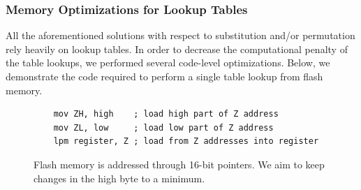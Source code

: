 \documentclass[11pt]{llncs2e} %
\begin{document}

 

\subsubsection{Memory Optimizations for Lookup Tables}
All the aforementioned solutions with respect to substitution and/or permutation rely heavily on lookup tables. In order to decrease the computational penalty of the table lookups, we performed several code-level optimizations. Below, we demonstrate the code required to perform a single table lookup from flash memory.

\begin{figure}[h]
\centering
	\begin{lstlisting}
	mov ZH, high    ; load high part of Z address
	mov ZL, low     ; load low part of Z address
	lpm register, Z ; load from Z addresses into register
	\end{lstlisting}
	\caption{\footnotesize Flash memory is addressed through 16-bit pointers. We aim to keep changes in the high byte to a minimum.}
\label{unpacking_code}
\end{figure}
\end{document}
